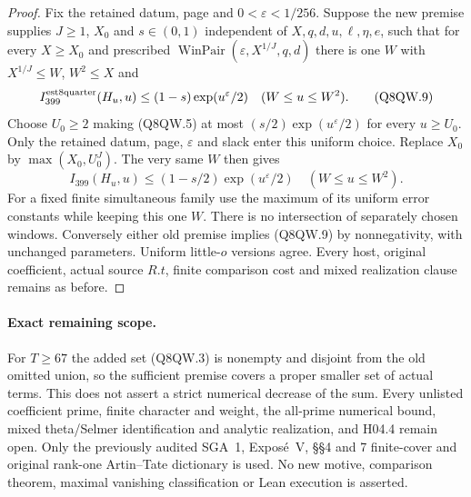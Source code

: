 \begin{proof}
Fix the retained datum, page and $0<\varepsilon<1/256$.
Suppose the new premise supplies $J\geq1$, $X_0$ and
$s\in(0,1)$ independent of $X,q,d,u,\ell,\eta,e$, such that
for every $X\geq X_0$ and prescribed
$\operatorname{WinPair}(\varepsilon,X^{1/J},q,d)$ there is
one $W$ with $X^{1/J}\leq W$, $W^2\leq X$ and
\[
 I_{399}^{\rm est8quarter}(H_u,u)\leq(1-s)\exp(u^\varepsilon/2)
                                      \quad(W\leq u\leq W^2).
 \tag{Q8QW.9}
\]
Choose $U_0\geq2$ making (Q8QW.5) at most
$(s/2)\exp(u^\varepsilon/2)$ for every $u\geq U_0$.
Only the retained datum, page, $\varepsilon$ and slack enter
this uniform choice.  Replace $X_0$ by $\max(X_0,U_0^J)$.
The very same $W$ then gives
\[
 I_{399}(H_u,u)\leq(1-s/2)\exp(u^\varepsilon/2)
                                      \quad(W\leq u\leq W^2).
 \tag{Q8QW.10}
\]
For a fixed finite simultaneous family use the maximum of its
uniform error constants while keeping this one $W$.
There is no intersection of separately chosen windows.
Conversely either old premise implies (Q8QW.9) by nonnegativity,
with unchanged parameters.  Uniform little-$o$ versions agree.
Every host, original coefficient, actual source $R.t$, finite
comparison cost and mixed realization clause remains as before.
\end{proof}

\paragraph{Exact remaining scope.}
For $T\geq67$ the added set (Q8QW.3) is nonempty and disjoint
from the old omitted union, so the sufficient premise covers a
proper smaller set of actual terms.
This does not assert a strict numerical decrease of the sum.
Every unlisted coefficient prime, finite character and weight,
the all-prime numerical bound, mixed theta/Selmer identification
and analytic realization, and H04.4 remain open.
Only the previously audited SGA~1, Expos\'e~V, \S\S4 and 7
finite-cover and original rank-one Artin--Tate dictionary is used.
No new motive, comparison theorem, maximal vanishing classification
or Lean execution is asserted.
